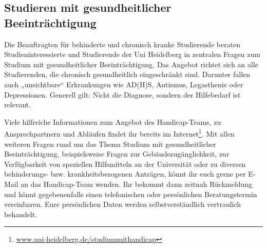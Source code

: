 \subsection{Studieren mit gesundheitlicher Beeinträchtigung}
Die Beauftragten für behinderte und chronisch kranke Studierende beraten Studieninteressierte und Studierende der Uni Heidelberg in zentralen Fragen zum Studium mit gesundheitlicher Beeinträchtigung.
Das Angebot richtet sich an alle Studierenden, die chronisch gesundheitlich eingeschränkt sind. Darunter fallen auch „unsichtbare“ Erkrankungen wie AD(H)S, Autismus, Legasthenie oder Depressionen. Generell gilt: Nicht die Diagnose, sondern der Hilfebedarf ist relevant.

Viele hilfreiche Informationen zum Angebot des Handicap-Teams, zu Ansprechpartnern und Abläufen findet ihr bereits im Internet\footnote{\url{www.uni-heidelberg.de/studiummithandicap}}. Mit allen weiteren Fragen rund um das Thema Studium mit gesundheitlicher Beeinträchtigung, beispielsweise Fragen zur Gebäudezugänglichkeit,  zur Verfügbarkeit von speziellen Hilfsmitteln an der Universität oder zu diversen behinderungs- bzw. krankheitsbezogenen Anträgen, könnt ihr euch gerne per E-Mail an das Handicap-Team wenden. Ihr bekommt dann zeitnah Rückmeldung und könnt gegebenenfalls einen telefonischen oder persönlichen Beratungstermin vereinbaren.
Eure persönlichen Daten werden selbstverständlich vertraulich behandelt.
